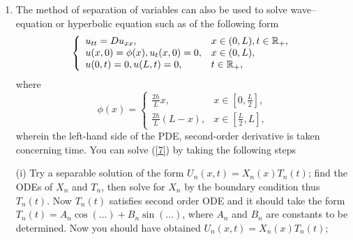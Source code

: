 \documentclass[6pt]{article}
\newtheorem{solution}{Solution}
\numberwithin{equation}{section}
\def\mathbb{\Bbb}
\begin{document}
\begin{enumerate}
\begin{solution}
According to the Sturm--Liouville Theory, we are able to write the solution in terms of the infinite series
\[u(x,t)=\sum_{n=1}^\infty C_n(t) \sin \frac{n\pi (x+L)}{2L}.\]
Substituting this solution into the PDE gives us
\[\sum_{n=1}^\infty C_n'(t) \sin \frac{n\pi (x+L)}{2L}=-D\sum_{n=1}^\infty C_n(t) \Big(\frac{n\pi}{2L}\Big)^2\sin \frac{n\pi (x+L)}{2L};\]
Multiplying BHS of the system above by $X_n(x)$ and then integrating it over $(-L,L)$, we obtain that
\[C_n'(t)=- D \Big(\frac{n\pi}{2L}\Big)^2C_n(t);\]
solving this ODE gives us
\[C_n(t)=C_n(0)e^{-D(\frac{n\pi}{2L})^2t},\]
where $C_n(0)$ can be evaluated by the initial condition as
\[C_n(0)=\frac{1}{L}\int_{-L}^L \phi(x) \sin \frac{n\pi (x+L)}{2L}dx.\]
\end{solution}




\item  The method of separation of variables can also be used to solve wave--equation or hyperbolic equation such as of the following form
\begin{equation}\label{7}
\left\{
\begin{array}{ll}
u_{tt}=Du_{xx},& x\in(0,L),t\in \mathbb R_+,\\
u(x,0)=\phi(x), u_t(x,0)=0, &x\in(0,L),\\
u(0,t)=0, u(L,t)=0, &t\in \mathbb R_+,
\end{array}
\right.
\end{equation}
where
\[\phi(x)=
\left\{
\begin{array}{ll}
\frac{2h}{L}x, &x\in[0,\frac{L}{2}],\\
\frac{2h}{L}(L-x),& x\in[\frac{L}{2},L],
\end{array}
\right.
\]
wherein the left-hand side of the PDE, second-order derivative is taken concerning time.  You can solve (\ref{7}) by taking the following steps

(i)  Try a separable solution of the form $U_n(x,t)=X_n(x)T_n(t)$;  find the ODEs of $X_n$ and $T_n$, then solve for $X_n$ by the boundary condition thus $T_n(t)$.  Now $T_n(t)$ satisfies second order ODE and it should take the form $T_n(t)=A_n \cos(...)+B_n\sin (...)$, where $A_n$ and $B_n$ are constants to be determined.  Now you should have obtained $U_n(x,t)=X_n(x)T_n(t)$;


\end{enumerate}
\end{document}
